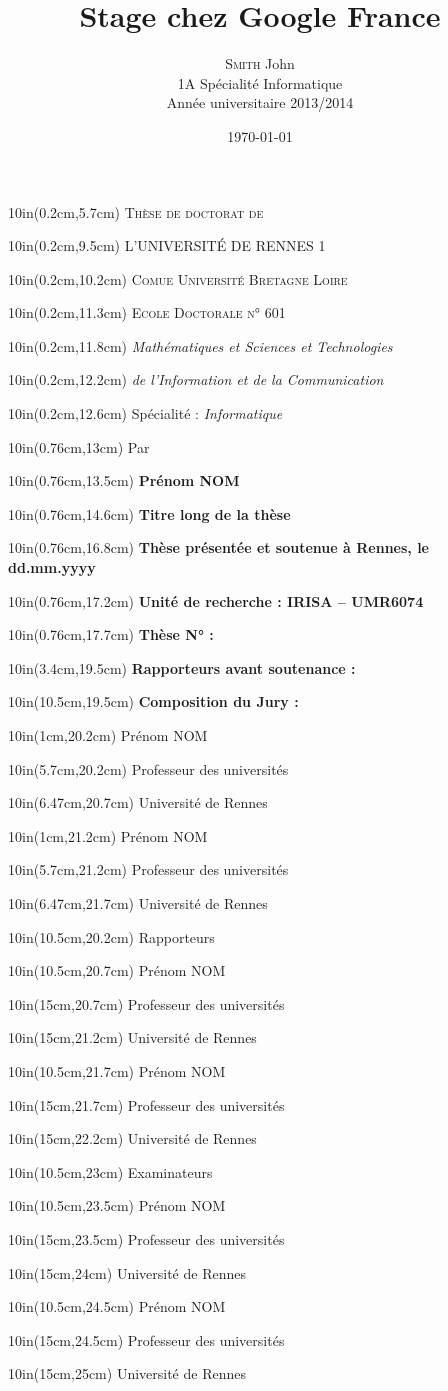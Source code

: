 \documentclass[a4paper]{report}
\title{\LARGE{Stage chez Google France}}
\author{\textsc{Smith} John\\1A Spécialité Informatique\\Année universitaire 2013/2014}
\date{\today}
\newcommand\PlaceText[3]{%
\begin{textblock*}{10in}(#1,#2)  %
#3
\end{textblock*}
}%
\newcommand{\blap}[1]{\vbox to 0pt{#1\vss}}
\newcommand\AtUpperLeftCorner[3]{%
\put(\LenToUnit{#1},\LenToUnit{\dimexpr\paperheight-#2}){\blap{#3}}%
}
\begin{document}
\begin{titlepage}
\enlargethispage{2cm}
\AddToShipoutPicture{
\AtUpperLeftCorner{0cm}{0cm}{\texttt{[image: data/MathStic-UR1.pdf]}}
}
\vspace*{3cm}

{
\selectfont 
\PlaceText{0.2cm}{5.7cm}{\Huge \scshape Thèse de doctorat de}
\PlaceText{0.2cm}{9.5cm}{\Large L'UNIVERSITÉ DE RENNES 1} %
\PlaceText{0.2cm}{10.2cm}{\large \scshape Comue Université Bretagne Loire}
\PlaceText{0.2cm}{11.3cm}{\scshape Ecole Doctorale n° 601}
\PlaceText{0.2cm}{11.8cm}{\textit{Mathématiques et Sciences et Technologies}}
\PlaceText{0.2cm}{12.2cm}{\textit{de l'Information et de la Communication}}
\PlaceText{0.2cm}{12.6cm}{Spécialité : \textit{Informatique}}
\PlaceText{0.76cm}{13cm}{Par}
\PlaceText{0.76cm}{13.5cm}{\huge \textbf{Prénom NOM}}
\PlaceText{0.76cm}{14.6cm}{\Large \textbf{Titre long de la thèse}}
\PlaceText{0.76cm}{16.8cm}{\textbf{Thèse présentée et soutenue à Rennes, le dd.mm.yyyy}}
\PlaceText{0.76cm}{17.2cm}{\textbf{Unité de recherche : IRISA – UMR6074}}
\PlaceText{0.76cm}{17.7cm}{\textbf{Thèse N° :}}

\PlaceText{3.4cm}{19.5cm}{\large \textbf{Rapporteurs avant soutenance :}}
\PlaceText{10.5cm}{19.5cm}{\large \textbf{Composition du Jury :}}

\PlaceText{1cm}{20.2cm}{\color{gray} Prénom NOM}
\PlaceText{5.7cm}{20.2cm}{\color{gray} Professeur des universités}
\PlaceText{6.47cm}{20.7cm}{\color{gray} Université de Rennes}

\PlaceText{1cm}{21.2cm}{\color{gray} Prénom NOM}
\PlaceText{5.7cm}{21.2cm}{\color{gray} Professeur des universités}
\PlaceText{6.47cm}{21.7cm}{\color{gray} Université de Rennes}

\PlaceText{10.5cm}{20.2cm}{\color{gray} Rapporteurs}
\PlaceText{10.5cm}{20.7cm}{\color{gray} Prénom NOM}
\PlaceText{15cm}{20.7cm}{\color{gray} Professeur des universités}
\PlaceText{15cm}{21.2cm}{\color{gray} Université de Rennes}

\PlaceText{10.5cm}{21.7cm}{\color{gray} Prénom NOM}
\PlaceText{15cm}{21.7cm}{\color{gray} Professeur des universités}
\PlaceText{15cm}{22.2cm}{\color{gray} Université de Rennes}

\PlaceText{10.5cm}{23cm}{\color{gray} Examinateurs}
\PlaceText{10.5cm}{23.5cm}{\color{gray} Prénom NOM}
\PlaceText{15cm}{23.5cm}{\color{gray} Professeur des universités}
\PlaceText{15cm}{24cm}{\color{gray} Université de Rennes}
\PlaceText{10.5cm}{24.5cm}{\color{gray} Prénom NOM}
\PlaceText{15cm}{24.5cm}{\color{gray} Professeur des universités}
\PlaceText{15cm}{25cm}{\color{gray} Université de Rennes}

}
\end{titlepage}
\end{document}
